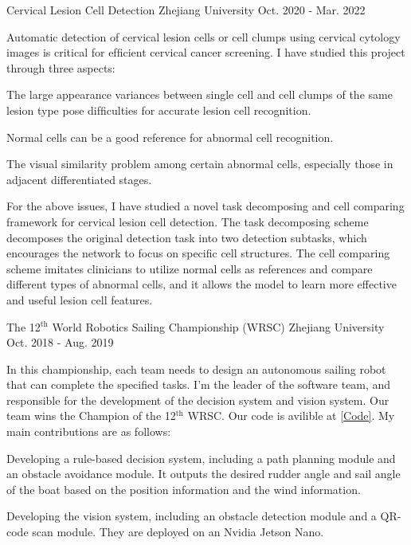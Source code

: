 \begin{cventries}
	\cventry
	{} %
	{Cervical Lesion Cell Detection} %
	{Zhejiang University} %
	{Oct. 2020 - Mar. 2022} %
	{
		Automatic detection of cervical lesion cells or cell clumps using cervical cytology images is critical for efﬁcient cervical cancer screening. I have studied this project through three aspects: \newline
		\vspace{4.5mm}
		\begin{cvitems} %
			\item{The large appearance variances between single cell and cell clumps of the same lesion type pose difﬁculties for accurate lesion cell recognition.}
			\item{Normal cells can be a good reference for abnormal cell recognition.}
			\item{The visual similarity problem among certain abnormal cells, especially those in adjacent differentiated stages.}
		\end{cvitems}
		\vspace{4.5mm}
		For the above issues, I have studied a novel task decomposing and cell comparing framework for cervical lesion cell detection. The task decomposing scheme decomposes the original detection task into two detection subtasks, which encourages the network to focus on specific cell structures. The cell comparing scheme imitates clinicians to utilize normal cells as references and compare different types of abnormal cells, and it allows the model to learn more effective and useful lesion cell features.
	}

	\cventry
	{} %
	{The 12$^\text{th}$ World Robotics Sailing Championship (WRSC)} %
	{Zhejiang University} %
	{Oct. 2018 - Aug. 2019} %
	{
		\quad In this championship, each team needs to design an autonomous sailing robot that can complete the specified tasks. I'm the leader of the software team, and responsible for the development of the decision system and vision system. Our team wins the Champion of the 12$^\text{th}$ WRSC. Our code is avilible at \href{https://github.com/ZMART-Sailing/sailing_robot}{\textcolor{link}{[Code]}}.\newline
		My main contributions are as follows: \newline
		\vspace{3.5mm}
		\begin{cvitems} %
			\item{Developing a rule-based decision system, including a path planning module and an obstacle avoidance module. It outputs the desired rudder angle and sail angle of the boat based on the position information and the wind information.}
			\item{Developing the vision system, including an obstacle detection module and a QR-code scan module. They are deployed on an Nvidia Jetson Nano.}
		\end{cvitems}
	}


\end{cventries}
